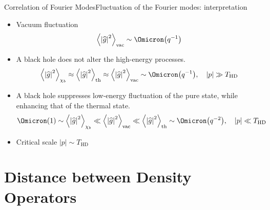 \documentclass{beamer}
\newcommand{\abr}[1]{{\left<#1\right>}}
\newcommand{\vbr}[1]{{\left|#1\right|}}
\newcommand{\rfun}[2]{{#1}\mathopen{}\left(#2\right)\mathclose{}}
\newcommand{\what}[1]{{\widehat{#1}}}
\begin{document}
\begin{frame}{Correlation of Fourier Modes}{Fluctuation of the Fourier 
modes: interpretation}

\begin{itemize}
	\item Vacuum fluctuation
	\begin{equation}
	\abr{\vbr{\what{g}}^2}_\text{vac} \sim \rfun{\Omicron}{q^{-1}}
	\end{equation}

	\item A black hole does \alert{not} alter the \alert{high}-energy
	processes.
	\begin{equation}
	\abr{\vbr{\what{g}}^2}_{\chi_b} \approx
	\abr{\vbr{\what{g}}^2}_\text{th} \approx
	\abr{\vbr{\what{g}}^2}_\text{vac} \sim \rfun{\Omicron}{q^{-1}},
	\quad \vbr{p} \gg T_\text{HD}
	\end{equation}

	\item A black hole \alert{suppresses} low-energy fluctuation of the
	\alert{pure} state, while \alert{enhancing} that of the
	\alert{thermal} state.
	\begin{equation}
	\rfun{\Omicron}{1} \sim \abr{\vbr{\what{g}}^2}_{\chi_b} \ll
	\abr{\vbr{\what{g}}^2}_\text{vac} \ll
	\abr{\vbr{\what{g}}^2}_\text{th} \sim \rfun{\Omicron}{q^{-2}},
	\quad \vbr{p} \ll T_\text{HD}
	\end{equation}
	\item Critical scale $\vbr{p} \sim T_\text{HD}$
\end{itemize}

\end{frame}

\section{Distance between Density Operators}
\end{document}
